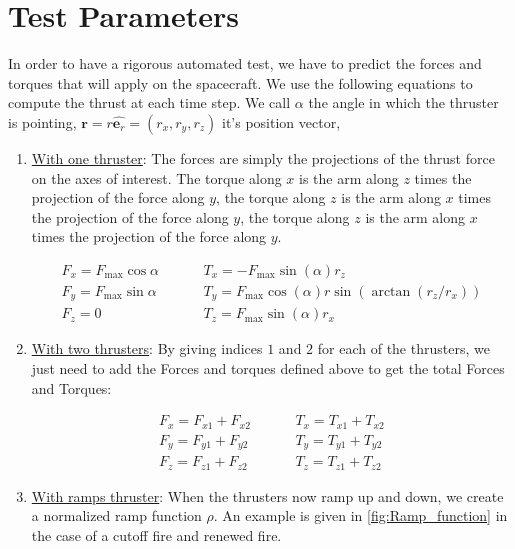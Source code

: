 \section{Test Parameters}


In order to have a rigorous automated test, we have to predict the forces and torques that will apply on the spacecraft. We use the following equations to compute the thrust at each time step. We call $\alpha$ the angle in which the thruster is pointing, $\bm r = r \hat{\bm e_r}= \left(r_x, r_y, r_z \right)$ it's position vector, 

\begin{enumerate}
\item{\underline{With one thruster}}: The forces are simply the projections of the thrust force on the axes of interest. The torque along $x$ is the arm along $z$ times the projection of the force along $y$, the torque along $z$ is the arm along $x$ times the projection of the force along $y$, the torque along $z$ is the arm along $x$ times the projection of the force along $y$. 

\begin{align}
F_x =F_{\mathrm{max}} \cos \alpha &\hspace{1cm} T_x = - F_{\mathrm{max}}\sin(\alpha) r_z \\ 
F_y = F_{\mathrm{max}} \sin \alpha &\hspace{1cm} T_y = F_{\mathrm{max}} \cos(\alpha) r \sin( \arctan(r_z/r_x)) \\ 
F_z = 0 &\hspace{1cm} T_z =  F_{\mathrm{max}} \sin(\alpha) r_x 
\end{align}


\item{\underline{With two thrusters}}: By giving indices $1$ and $2$ for each of the thrusters, we just need to add the Forces and torques defined above to get the total Forces and Torques:

\begin{align}
F_x = F_{x1} + F_{x2} &\hspace{1cm} T_x = T_{x1} + T_{x2} \\ 
F_y =  F_{y1} + F_{y2} &\hspace{1cm} T_y =  T_{y1} + T_{y2}\\ 
F_z =  F_{z1} + F_{z2} &\hspace{1cm} T_z =  T_{z1} + T_{z2}
\end{align}

\item{\underline{With ramps thruster}}: When the thrusters now ramp up and down, we create a normalized ramp function $\rho$. An example is given in \ref{fig:Ramp_function} in the case of a cutoff fire and renewed fire. \par


\end{enumerate}
